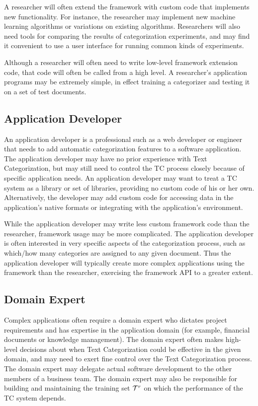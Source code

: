 A researcher will often extend the framework with custom code that
implements new functionality.  For instance, the researcher may
implement new machine learning algorithms or variations on existing
algorithms.  Researchers will also need tools for comparing the
results of categorization experiments, and may find it convenient to
use a user interface for running common kinds of experiments.

Although a researcher will often need to write low-level framework
extension code, that code will often be called from a high level.  A
researcher's application programs may be extremely simple, in effect
training a categorizer and testing it on a set of test documents.  

\subsection{Application Developer}

An application developer is a professional such as a web developer or
engineer that needs to add automatic categorization features to a
software application.  The application developer may have no prior
experience with Text Categorization, but may still need to control the
TC process closely because of specific application needs.  An
application developer may want to treat a TC system as a library or
set of libraries, providing no custom code of his or her own.
Alternatively, the developer may add custom code for accessing data in
the application's native formats or integrating with the application's
environment.

While the application developer may write less custom framework code
than the researcher, framework usage may be more complicated.  The
application developer is often interested in very specific aspects of
the categorization process, such as which/how many categories are
assigned to any given document.  Thus the application developer will
typically create more complex applications using the framework than
the researcher, exercising the framework API to a greater extent.

\subsection{Domain Expert}

Complex applications often require a domain expert who dictates
project requirements and has expertise in the application domain (for
example, financial documents or knowledge management).  The domain
expert often makes high-level decisions about when Text Categorization
could be effective in the given domain, and may need to exert fine
control over the Text Categorization process.  The domain expert may
delegate actual software development to the other members of a
business team.  The domain expert may also be responsible for building
and maintaining the training set $\mathcal{T}^r$ on which the performance of
the TC system depends.


